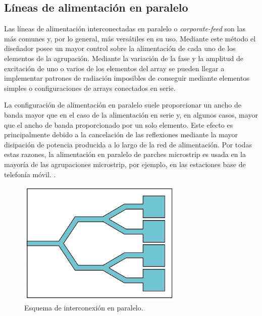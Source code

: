 \subsection{Líneas de alimentación en paralelo}
\par Las líneas de alimentación interconectadas en paralelo o \textit{corporate-feed} son las más comunes y, por lo general, más versátiles en su uso. Mediante este método el diseñador posee un mayor control sobre la alimentación de cada uno de los elementos de la agrupación. Mediante la variación de la fase y la amplitud de excitación de uno o varios de los elementos del array se pueden llegar a implementar patrones de radiación imposibles de conseguir mediante elementos simples o configuraciones de arrays conectados en serie.
\\
\par La configuración de alimentación en paralelo suele proporcionar un ancho de banda mayor que en el caso de la alimentación en serie y, en algunos casos, mayor que el ancho de banda proporcionado por un solo elemento. Este efecto es principalmente debido a la cancelación de las reflexiones mediante la mayor disipación de potencia producida a lo largo de la red de alimentación. Por todas estas razones, la alimentación en paralelo de parches microstrip es usada en la mayoría de las agrupaciones microstrip, por ejemplo, en las estaciones base de telefonía móvil. \cite{Waterhouse2010}. 

\begin{figure}[p]
    \centering
        \includegraphics[width=0.7\textwidth]{archivos/array/corporate}
        \caption{Esquema de interconexión en paralelo. \cite{Balanis2015}}
        \label{fig:corporatefeedfeed}
\end{figure}

